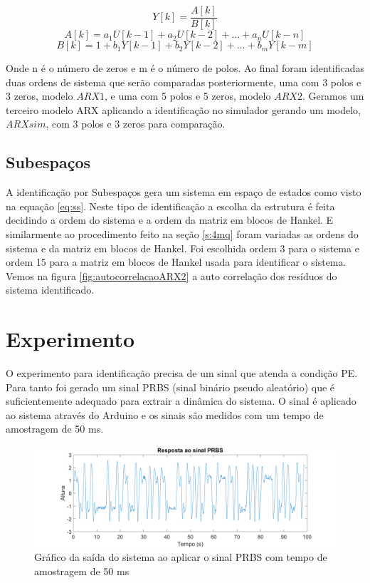 \begin{equation}
Y[k]=\dfrac{A[k]}{B[k]}
\end{equation}
\begin{equation}
A[k]=a_1 U[k-1]+a_2 U[k-2]+ \dots + a_n U[k-n]
\end{equation}
\begin{equation}
B[k]=1+b_1 Y[k-1]+b_2 Y[k-2]+ \dots + b_m Y[k-m]
\end{equation}

Onde n é o número de zeros e m é o número de polos. Ao final foram identificadas duas ordens de sistema que serão comparadas posteriormente, uma com 3 polos e 3 zeros, modelo $ARX1$, e uma com 5 polos e 5 zeros, modelo $ARX2$. Geramos um terceiro modelo ARX aplicando a identificação no simulador gerando um modelo, $ARXsim$, com 3 polos e 3 zeros para comparação.

\subsection{Subespaços}\label{s:4subespacos}
A identificação por Subespaços gera um sistema em espaço de estados como visto na equação \eqref{eq:ss}. Neste tipo de identificação a escolha da estrutura é feita decidindo a ordem do sistema e a ordem da matriz em blocos de Hankel. E similarmente ao procedimento feito na seção \ref{s:4mq} foram variadas as ordens do sistema e da matriz em blocos de Hankel.
Foi escolhida ordem 3 para o sistema e ordem 15 para a matriz em blocos de Hankel usada para identificar o sistema. Vemos na figura \ref{fig:autocorrelacaoARX2} a auto correlação dos resíduos do sistema identificado. 



\section{Experimento}\label{s:4experimento}
O experimento para identificação precisa de um sinal que atenda a condição PE. Para tanto foi gerado um sinal PRBS (sinal binário pseudo aleatório) que é suficientemente adequado para extrair a dinâmica do sistema. O sinal é aplicado ao sistema através do Arduino e os sinais são medidos com um tempo de amostragem de 50 ms.
\begin{figure}[H]
	\centering
	\includegraphics[width=1\linewidth]{sinalprbsid}
	\caption[Gráfico da saída PRBS do sistema]{Gráfico da saída do sistema ao aplicar o sinal PRBS com tempo de amostragem de 50 ms}
	\label{fig:sinalprbsid}
\end{figure}

